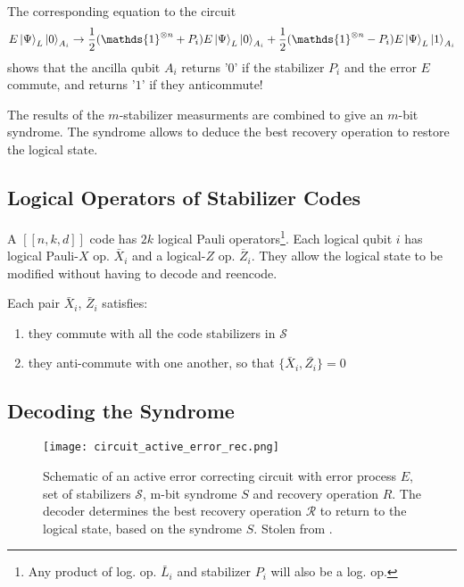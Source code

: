 The corresponding equation to the circuit
\begin{equation}
    E \ket{\Psi}_L \ket{0}_{A_i} \rightarrow \frac{1}{2} (\mathds{1}^{\otimes n} + P_i) E \ket{\Psi}_L \ket{0}_{A_i} +  \frac{1}{2} (\mathds{1}^{\otimes n} - P_i) E   \ket{\Psi}_L \ket{1}_{A_i} 
\end{equation}
shows that the ancilla qubit $A_i$ returns '$0$' if the stabilizer $P_i$ and the error $E$ commute,
and returns '$1$' if they anticommute! 

The results of the $m$-stabilizer measurments are combined to give an $m$-bit syndrome.
The syndrome allows to deduce the best recovery operation to restore the logical state.

\subsection{Logical Operators of Stabilizer Codes}

A $[[n,k,d]]$ code has $2k$ logical Pauli operators\footnote{Any product of log. op. $\bar{L}_i$ and stabilizer $P_i$ will also be a log. op.}. 
Each logical qubit $i$ has logical Pauli-$X$ op. $\bar{X}_i$ and a logical-$Z$ op. $\bar{Z}_i$. 
They allow the logical state to be modified without having to decode and reencode. \cite{QECintro}

Each pair $\bar{X}_i$, $\bar{Z}_i$ satisfies:
\begin{enumerate}
    \item they commute with all the code stabilizers in $\mathcal{S}$
    \item they anti-commute with one another, so that $\{ \bar{X}_i, \bar{Z_i}\}=0$
\end{enumerate}

\subsection{Decoding the Syndrome}

\begin{figure}[h]
    \begin{center}
        \texttt{[image: circuit\_active\_error\_rec.png]}
    \end{center}
    \caption{
    Schematic of an active error correcting circuit with error process $E$, set of stabilizers $\mathcal{S}$, m-bit syndrome $S$ and recovery operation $R$.
    The decoder determines the best recovery operation $\mathcal{R}$ to return to the logical state, based on the syndrome $S$.
    Stolen from \cite{QECintro}.
    }
    \label{fig:basic.qc.qec_circuit}
\end{figure}

